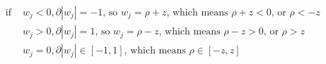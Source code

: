 \newcommand{\matrix}[1]{\mathbf{#1}}
\newcommand{\vector}[1]{\mathbf{#1}}
\newcommand{\X}{\matrix{X}}
\newcommand{\y}{\vector{y}}
\newcommand{\w}{\vector{w}}
\newcommand{\r}{\vector{r}}
\begin{align*}
\text{ if } & w_j < 0, \partial |w_j| = -1 \text{, so } w_j = \rho + z \text{, which means } \rho + z < 0 \text{, or } \rho < -z \\
            & w_j > 0, \partial |w_j| =  1 \text{, so } w_j = \rho - z \text{, which means } \rho - z > 0 \text{, or } \rho >  z \\
            & w_j = 0, \partial |w_j| \in [-1, 1]                      \text{, which means } \rho \in  [-z, z] \\
\end{align*}
